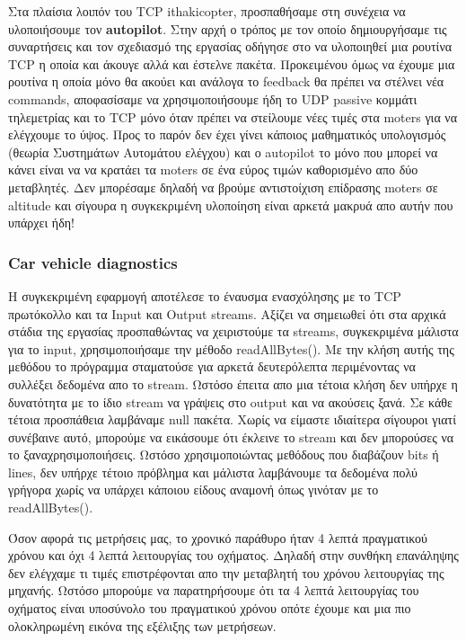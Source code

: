 \documentclass[hidelinks, 12pt, a4paper]{article}
\begin{document}
Στα πλαίσια λοιπόν του TCP ithakicopter, προσπαθήσαμε στη συνέχεια να υλοποιήσουμε τον \textbf{autopilot}. Στην αρχή ο τρόπος με τον οποίο δημιουργήσαμε τις συναρτήσεις και τον σχεδιασμό της εργασίας οδήγησε στο να υλοποιηθεί μια ρουτίνα TCP η οποία και άκουγε αλλά και έστελνε πακέτα. Προκειμένου όμως να έχουμε μια ρουτίνα η οποία μόνο θα ακούει και ανάλογα το feedback θα πρέπει να στέλνει νέα commands, αποφασίσαμε να χρησιμοποιήσουμε ήδη το  UDP passive κομμάτι τηλεμετρίας και το TCP μόνο όταν πρέπει να στείλουμε νέες τιμές στα moters για να ελέγχουμε το ύψος. Προς το παρόν δεν έχει γίνει κάποιος μαθηματικός υπολογισμός (θεωρία Συστημάτων Αυτομάτου ελέγχου) και ο autopilot το μόνο που μπορεί να κάνει είναι να να κρατάει τα moters σε ένα εύρος τιμών καθορισμένο απο δύο μεταβλητές. Δεν μπορέσαμε δηλαδή να βρούμε αντιστοίχιση επίδρασης moters σε altitude και σίγουρα η συγκεκριμένη υλοποίηση είναι αρκετά μακρυά απο αυτήν που υπάρχει ήδη! 


\subsubsection{Car vehicle diagnostics}

Η συγκεκριμένη εφαρμογή αποτέλεσε το έναυσμα ενασχόλησης με το TCP πρωτόκολλο και τα Input και Output streams. Αξίζει να σημειωθεί ότι στα αρχικά στάδια της εργασίας προσπαθώντας να χειριστούμε τα streams, συγκεκριμένα μάλιστα για το input, χρησιμοποιήσαμε την μέθοδο readAllBytes(). Με την κλήση αυτής της μεθόδου το πρόγραμμα σταματούσε για αρκετά δευτερόλεπτα περιμένοντας να συλλέξει δεδομένα απο το stream. Ωστόσο έπειτα απο μια τέτοια κλήση δεν υπήρχε η δυνατότητα με το ίδιο stream να γράψεις στο output και να ακούσεις ξανά. Σε κάθε τέτοια προσπάθεια λαμβάναμε null πακέτα. Χωρίς να είμαστε ιδιαίτερα σίγουροι γιατί συνέβαινε αυτό, μπορούμε να εικάσουμε ότι έκλεινε το stream και δεν μπορούσες να το ξαναχρησιμοποιήσεις. Ωστόσο χρησιμοποιώντας μεθόδους που διαβάζουν bits ή lines, δεν υπήρχε τέτοιο πρόβλημα και μάλιστα λαμβάνουμε τα δεδομένα πολύ γρήγορα χωρίς να υπάρχει κάποιου είδους αναμονή όπως γινόταν με το readAllBytes().  

Όσον αφορά τις μετρήσεις μας, το χρονικό παράθυρο ήταν 4 λεπτά πραγματικού χρόνου και όχι 4 λεπτά λειτουργίας του οχήματος. Δηλαδή στην συνθήκη επανάληψης δεν ελέγχαμε τι τιμές επιστρέφονται απο την μεταβλητή του χρόνου λειτουργίας της μηχανής. Ωστόσο μπορούμε να παρατηρήσουμε ότι τα 4 λεπτά λειτουργίας του οχήματος είναι υποσύνολο του πραγματικού χρόνου οπότε έχουμε και μια πιο ολοκληρωμένη εικόνα της εξέλιξης των μετρήσεων. 
\end{document}
